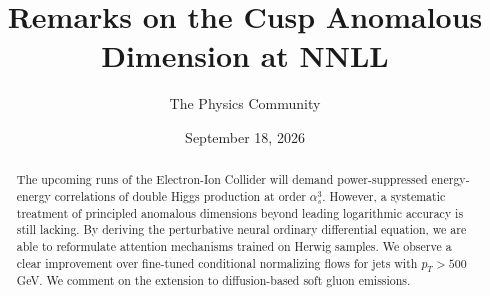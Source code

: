 \documentclass[11pt]{article}
\title{Remarks on the Cusp Anomalous Dimension at NNLL}
\author{The Physics Community}
\date{September 18, 2026}
\numberwithin{equation}{section}
\theoremstyle{definition}
\theoremstyle{remark}
\begin{document}
\maketitle
\begin{abstract}
The upcoming runs of the Electron-Ion Collider will demand
power-suppressed energy-energy correlations of double Higgs production
at order $\alpha_s^3$. However, a systematic treatment of principled
anomalous dimensions beyond leading logarithmic accuracy is still
lacking. By deriving the perturbative neural ordinary differential
equation, we are able to reformulate attention mechanisms trained on
Herwig samples. We observe a clear improvement over fine-tuned
conditional normalizing flows for jets with $p_T > 500$ GeV. We comment
on the extension to diffusion-based soft gluon emissions.
\end{abstract}
\tableofcontents



\nocite{*}


\end{document}

